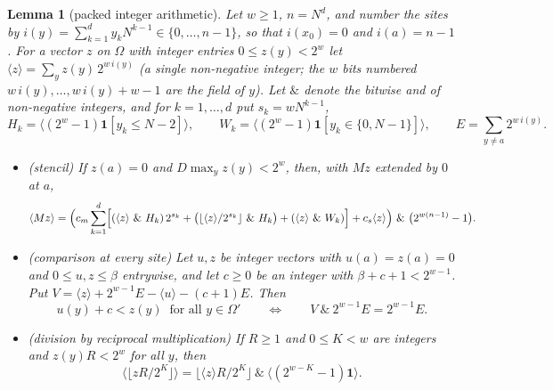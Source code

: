 \documentclass[11pt,a4paper]{article}
\newtheorem{lemma}[theorem]{Lemma}
\theoremstyle{definition}
\theoremstyle{remark}
\begin{document}
\begin{lemma}[packed integer arithmetic]\label{lem:packed}
Let $w\ge1$, $n=N^d$, and number the sites by $i(y)=\sum_{k=1}^dy_kN^{k-1}\in\{0,\dots,n-1\}$, so that $i(x_0)=0$ and $i(a)=n-1$. For a vector $z$ on $\Omega$ with integer entries $0\le z(y)<2^w$ let $\langle z\rangle=\sum_{y}z(y)\,2^{w\,i(y)}$ (a single non-negative integer; the $w$ bits numbered $w\,i(y),\dots,w\,i(y)+w-1$ are the \emph{field} of $y$). Let $\&$ denote the bitwise and of non-negative integers, and for $k=1,\dots,d$ put $s_k=wN^{k-1}$,
\[
H_k=\bigl\langle(2^w-1)\mathbf 1[y_k\le N-2]\bigr\rangle,\qquad W_k=\bigl\langle(2^w-1)\mathbf 1[y_k\in\{0,N-1\}]\bigr\rangle,\qquad E=\sum_{y\ne a}2^{w\,i(y)} .
\]
\begin{itemize}
\item[(a)] (stencil) If $z(a)=0$ and $D\max_yz(y)<2^w$, then, with $Mz$ extended by $0$ at $a$,
\[
\langle Mz\rangle=\Bigl(c_m\sum_{k=1}^d\Bigl[(\langle z\rangle\ \&\ H_k)\,2^{s_k}+\bigl(\lfloor\langle z\rangle/2^{s_k}\rfloor\ \&\ H_k\bigr)+(\langle z\rangle\ \&\ W_k)\Bigr]+c_s\langle z\rangle\Bigr)\ \&\ \bigl(2^{w(n-1)}-1\bigr).
\]
\item[(b)] (comparison at every site) Let $u,z$ be integer vectors with $u(a)=z(a)=0$ and $0\le u,z\le\beta$ entrywise, and let $c\ge0$ be an integer with $\beta+c+1<2^{w-1}$. Put $V=\langle z\rangle+2^{w-1}E-\langle u\rangle-(c+1)E$. Then
\[
u(y)+c<z(y)\ \text{ for all }y\in\Omega'\qquad\Longleftrightarrow\qquad V\ \&\ 2^{w-1}E=2^{w-1}E .
\]
\item[(c)] (division by reciprocal multiplication) If $R\ge1$ and $0\le K<w$ are integers and $z(y)R<2^w$ for all $y$, then
\[
\bigl\langle\lfloor zR/2^K\rfloor\bigr\rangle=\bigl\lfloor\langle z\rangle R/2^K\bigr\rfloor\ \&\ \bigl\langle(2^{w-K}-1)\mathbf 1\bigr\rangle .
\]
\end{itemize}
\end{lemma}
\end{document}
